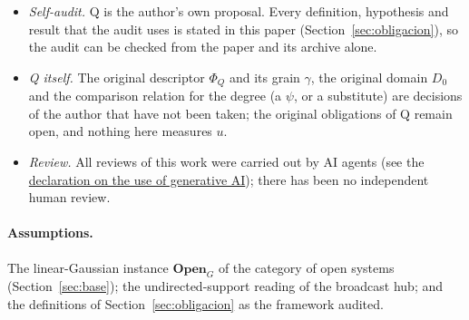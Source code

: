 \begin{itemize}
\item \emph{Self-audit.} Q is the author's own proposal. Every definition, hypothesis and result that the audit uses is stated in this paper (Section~\ref{sec:obligacion}), so the audit can be checked from the paper and its archive alone.
\item \emph{Q itself.} The original descriptor $\Phi_Q$ and its grain $\gamma$, the original domain $D_0$ and the comparison relation for the degree (a $\psi$, or a substitute) are decisions of the author that have not been taken; the original obligations of Q remain open, and nothing here measures $u$.
\item \emph{Review.} All reviews of this work were carried out by AI agents (see the \hyperref[sec:ai]{declaration on the use of generative AI}); there has been no independent human review.
\end{itemize}

\paragraph{Assumptions.} The linear-Gaussian instance $\mathbf{Open}_G$ of the category of open systems (Section~\ref{sec:base}); the undirected-support reading of the broadcast hub; and the definitions of Section~\ref{sec:obligacion} as the framework audited.

